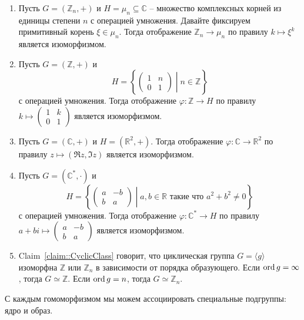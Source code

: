 \begin{examples}
\begin{enumerate}
\item Пусть $G = (\mathbb Z_n, +)$ и $H = \mu_n\subseteq \mathbb C$ -- множество комплексных корней из единицы степени $n$ с операцией умножения.
Давайте фиксируем примитивный корень $\xi \in\mu_n$.
Тогда отображение $\mathbb Z_n \to \mu_n$ по правилу $k \mapsto \xi^k$ является изоморфизмом.

\item Пусть $G = (\mathbb Z, +)$ и
\[
H = \left\{\left.
\begin{pmatrix}
{1}&{n}\\
{0}&{1}
\end{pmatrix}
\;\right|\;
n\in \mathbb Z
\right\}
\]
с операцией умножения.
Тогда отображение $\varphi\colon \mathbb Z\to H$ по правилу $k \mapsto \left(\begin{smallmatrix}{1}&{k}\\{0}&{1}\end{smallmatrix}\right)$ является изоморфизмом.

\item Пусть $G = (\mathbb C, +)$ и $H = (\mathbb R^2, +)$.
Тогда отображение $\varphi \colon \mathbb C\to \mathbb R^2$ по правилу $z \mapsto (\Re z, \Im z)$ является изоморфизмом.

\item Пусть $G = (\mathbb C^*, \cdot)$ и
\[
H = \left\{\left.
\begin{pmatrix}
{a}&{-b}\\
{b}&{a}
\end{pmatrix}
\;\right|\;
a, b\in \mathbb R\text{ такие что }a^2 + b^2 \neq 0
\right\}
\]
с операцией умножения.
Тогда отображение $\varphi \colon \mathbb C^*\to H$ по правилу $a + bi \mapsto \left(\begin{smallmatrix}{a}&{-b}\\{b}&{a}\end{smallmatrix}\right)$ является изоморфизмом.

\item Claim~\ref{claim::CyclicClass} говорит, что циклическая группа $G = \langle g \rangle$ изоморфна $\mathbb Z$ или $\mathbb Z_n$ в зависимости от порядка образующего.
Если $\operatorname{ord} g = \infty$, тогда $G\simeq \mathbb Z$.
Если $\operatorname{ord} g = n$, тогда $G\simeq \mathbb Z_n$.
\end{enumerate}
\end{examples}

С каждым гомоморфизмом мы можем ассоциировать специальные подгруппы: ядро и образ.

